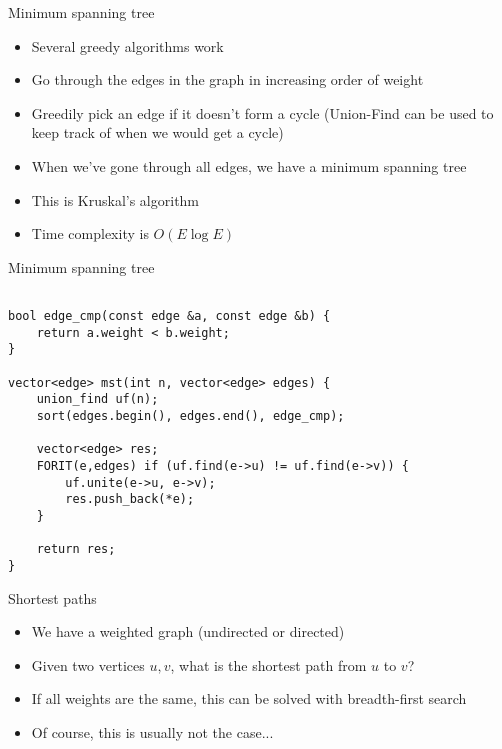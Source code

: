 \documentclass[12pt,t]{beamer}
\newcommand{\bi}{\begin{itemize}}
\newcommand{\ei}{\end{itemize}}
\begin{document}
\begin{frame}{Minimum spanning tree}
    \vspace{20pt}
    \bi
        \item Several greedy algorithms work
        \vspace{10pt}
        \item Go through the edges in the graph in increasing order of weight
        \item Greedily pick an edge if it doesn't form a cycle (Union-Find can be used to keep track of when we would get a cycle)
        \item When we've gone through all edges, we have a minimum spanning tree
        \vspace{10pt}
        \item This is Kruskal's algorithm
        \item Time complexity is $O(E \log E)$
    \ei
\end{frame}

\begin{frame}[fragile]{Minimum spanning tree}
    \begin{verbatim}

bool edge_cmp(const edge &a, const edge &b) {
    return a.weight < b.weight;
}

vector<edge> mst(int n, vector<edge> edges) {
    union_find uf(n);
    sort(edges.begin(), edges.end(), edge_cmp);

    vector<edge> res;
    FORIT(e,edges) if (uf.find(e->u) != uf.find(e->v)) {
        uf.unite(e->u, e->v);
        res.push_back(*e);
    }

    return res;
}
    \end{verbatim}
\end{frame}


\begin{frame}{Shortest paths}
    \vspace{40pt}
    \bi
        \item We have a weighted graph (undirected or directed)
        \item Given two vertices $u,v$, what is the shortest path from $u$ to $v$?
        \vspace{10pt}
        \item If all weights are the same, this can be solved with breadth-first search
        \item Of course, this is usually not the case...
    \ei
\end{frame}
\end{document}
